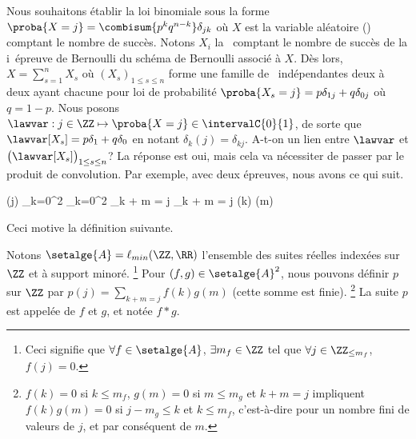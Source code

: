 Nous souhaitons établir la loi binomiale sous la forme
$\proba{X = j} = \combisum{p^k q^{n-k}} \delta_{jk}$
où $X$ est la variable aléatoire (\va) comptant le nombre de succès.
%
Notons $X_i$ la \va\ comptant le nombre de succès de la i\ieme\ épreuve de Bernoulli du schéma de Bernoulli associé à $X$.
Dès lors,
$X = \sum_{s=1}^{n} X_s$ 
où
$(X_s)_{1 \leq s \leq n}$ forme une famille de \va\ indépendantes deux à deux  ayant chacune pour loi de probabilité $\proba{X_s = j} = p \delta_{1j} + q \delta_{0j}$ où $q = 1 - p$.
Nous posons
$\lawvar: j \in \ZZ \mapsto \proba{X = j} \in \intervalC{0}{1}$,
de sorte que
$\lawvar[X_s] = p \delta_{1} + q \delta_{0}$
en notant
$\delta_{k}(j) = \delta_{kj}$.
A-t-on un lien entre $\lawvar$ et $\big( \lawvar[X_s] \big)_{1 \leq s \leq n}$? La réponse est oui, mais cela va nécessiter de passer par le produit de convolution.
%
Par exemple, avec deux épreuves, nous avons ce qui suit.

\newpage

\begin{stepcalc}[style=sar]
	\lawvar(j)
\explnext{}
\explnext{}
	\dsum_{k=0}^{2} 
	\dsum_{k=0}^{2}  
	\dsum_{k + m = j}  
\explnext{}
	\dsum_{k + m = j} \lawvar[X_1](k) \lawvar[X_2](m)
\end{stepcalc}

Ceci motive la définition suivante.




\begin{defi}
	Notons $\setalge{A} = \ell_{min}(\ZZ , \RR)$ l'ensemble des suites réelles indexées sur $\ZZ$ et à support minoré.%
	\footnote{
		Ceci signifie que 
		$\forall f \in \setalge{A}$, 
		$\exists m_f \in \ZZ$ 
		tel que
		$\forall j \in \ZZ_{\leq m_f}$, $f(j) = 0$.
	}
	Pour $(f,g) \in \setalge{A}^2$,
	nous pouvons définir $p$ sur $\ZZ$ par
	$p(j) = \sum_{k + m = j} f(k) g(m)$
	(cette somme est finie).%
	\footnote{
		$f(k) = 0$ si $k \leq m_f$,
		$g(m) = 0$ si $m \leq m_g$
		et
		$k + m = j$
		impliquent
		$f(k) g(m) = 0$
		si
		$j - m_g \leq k$ et $k \leq m_f$,
		c'est-à-dire pour un nombre fini de valeurs de $j$, et par conséquent de $m$.
		
	}
	La suite $p$ est appelée  de $f$ et $g$,
	et notée $f \ast g$.
\end{defi}


